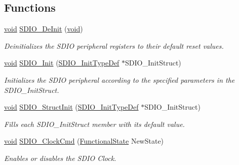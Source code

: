 \subsection*{Functions}
\begin{DoxyCompactItemize}
\item 
\hyperlink{usb__devapi_8h_afabf60e7f57651d6d595a02c75f07cd0}{void} \hyperlink{group___s_d_i_o___exported___functions_gac359d2c6c67a2590f8f9b720c0e4ff1b}{S\+D\+I\+O\+\_\+\+De\+Init} (\hyperlink{usb__devapi_8h_afabf60e7f57651d6d595a02c75f07cd0}{void})
\begin{DoxyCompactList}\small\item\em Deinitializes the S\+D\+IO peripheral registers to their default reset values. \end{DoxyCompactList}\item 
\hyperlink{usb__devapi_8h_afabf60e7f57651d6d595a02c75f07cd0}{void} \hyperlink{group___s_d_i_o___exported___functions_gad40764a8e37c0ed5c9141ae338ff0203}{S\+D\+I\+O\+\_\+\+Init} (\hyperlink{struct_s_d_i_o___init_type_def}{S\+D\+I\+O\+\_\+\+Init\+Type\+Def} $\ast$S\+D\+I\+O\+\_\+\+Init\+Struct)
\begin{DoxyCompactList}\small\item\em Initializes the S\+D\+IO peripheral according to the specified parameters in the S\+D\+I\+O\+\_\+\+Init\+Struct. \end{DoxyCompactList}\item 
\hyperlink{usb__devapi_8h_afabf60e7f57651d6d595a02c75f07cd0}{void} \hyperlink{group___s_d_i_o___exported___functions_ga778d338c29df4fae9ef69432e6df32ad}{S\+D\+I\+O\+\_\+\+Struct\+Init} (\hyperlink{struct_s_d_i_o___init_type_def}{S\+D\+I\+O\+\_\+\+Init\+Type\+Def} $\ast$S\+D\+I\+O\+\_\+\+Init\+Struct)
\begin{DoxyCompactList}\small\item\em Fills each S\+D\+I\+O\+\_\+\+Init\+Struct member with its default value. \end{DoxyCompactList}\item 
\hyperlink{usb__devapi_8h_afabf60e7f57651d6d595a02c75f07cd0}{void} \hyperlink{group___s_d_i_o___exported___functions_ga7243b857d6b323748ff3a493b265bedc}{S\+D\+I\+O\+\_\+\+Clock\+Cmd} (\hyperlink{agilefox_2library_2inc_2stm32f10x__type_8h_ac9a7e9a35d2513ec15c3b537aaa4fba1}{Functional\+State} New\+State)
\begin{DoxyCompactList}\small\item\em Enables or disables the S\+D\+IO Clock. \end{DoxyCompactList}\item 

\end{DoxyCompactItemize}
